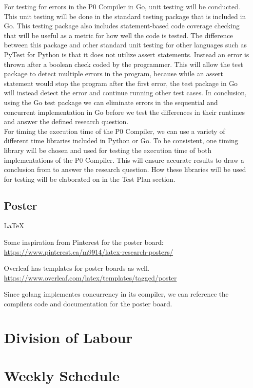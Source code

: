 \documentclass{article}
\begin{document}
For testing for errors in the P0 Compiler in Go, unit testing will be conducted. This unit testing will be done in the standard testing package that is
included in Go. This testing package also includes statement-based code coverage checking that will be useful as a metric for how well the code is tested.
The difference between this package and other standard unit testing for other languages such as PyTest for Python is that it does not utilize assert statements.
Instead an error is thrown after a boolean check coded by the programmer. This will allow the test package to detect multiple errors in the program, because
while an assert statement would stop the program after the first error, the test package in Go will instead detect the error and continue running other test cases.
In conclusion, using the Go test package we can eliminate errors in the sequential and concurrent implementation in Go before we test the differences in their runtimes
and answer the defined research question. \\    

For timing the execution time of the P0 Compiler, we can use a variety of different time libraries included in Python or Go. To be consistent, one timing library 
will be chosen
and used for testing the execution time of both implementations of the P0 Compiler. This will ensure 
accurate results to draw a conclusion from to answer the research question. How these libraries will be used for testing will be elaborated on in the Test Plan section.

\subsection{Poster} %

\LaTeX~

Some inspiration from Pinterest for the poster board:
\url{https://www.pinterest.ca/m9914/latex-research-posters/}

Overleaf has templates for poster boards as well.
\url{https://www.overleaf.com/latex/templates/tagged/poster}

Since golang implementes concurrency in its compiler, we can reference the
compilers code and documentation for the poster board.

\section{Division of Labour} %

\section{Weekly Schedule} %
\end{document}

